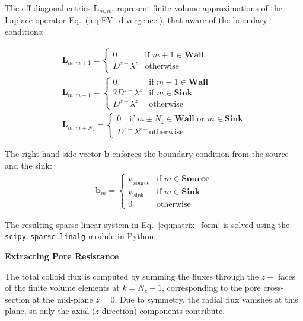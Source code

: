 \documentclass[10pt, a4paper, twocolumn]{article}
\begin{document}
The off-diagonal entries $\bm{L}_{m,m'}$ represent finite-volume approximations of the Laplace operator Eq.~(\ref{eq:FV_divergence}), that aware of the boundary conditions:

\begin{eqnarray}
    \bm{L}_{m,m+1} =
    \begin{cases}
        0 &  \text{if } m+1 \in \textbf{Wall} \\
        D^{z+} \lambda^{z} &  \text{otherwise}
    \end{cases}
    \\
    \bm{L}_{m,m-1} =
    \begin{cases}
        0 &  \text{if } m-1 \in \textbf{Wall} \\
        2 D^{z-} \lambda^{z} & \text{if } m \in \textbf{Sink}\\
        D^{z-} \lambda^{z} &  \text{otherwise}
    \end{cases}
    \\
    \bm{L}_{m,m \pm N_z} =
    \begin{cases}
        0 \quad \text{if } m \pm N_z \in \textbf{Wall} \text{ or } m \in \textbf{Sink} \\
        D^{r\pm} \lambda^{r\pm}  \text{otherwise}
    \end{cases}
\end{eqnarray}


The right-hand side vector $\bm{b}$ enforces the boundary condition from the source and the sink:
\begin{eqnarray}
    \bm{b}_m = 
    \begin{cases}
        \psi_{\text{source}} & \text{if } m \in \textbf{Source} \\
        \psi_{\text{sink}} & \text{if } m \in \textbf{Sink} \\
        0 & \text{otherwise}
    \end{cases}
\end{eqnarray}

The resulting sparse linear system in Eq.~\eqref{eq:matrix_form} is solved using the \texttt{scipy.sparse.linalg} module in Python.

\textbf{Extracting Pore Resistance}

The total colloid flux is computed by summing the fluxes through the $z+$ faces of the finite volume elements at $k = N_z - 1$, corresponding to the pore cross-section at the mid-plane $z = 0$.
Due to symmetry, the radial flux vanishes at this plane, so only the axial ($z$-direction) components contribute.
\end{document}
